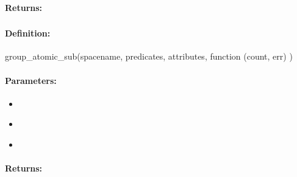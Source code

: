 \paragraph{Returns:}


\pagebreak
\subsubsection{}
\label{api:nodejs:group_atomic_sub}


\paragraph{Definition:}
\begin{javascriptcode}
group_atomic_sub(spacename, predicates, attributes, function (count, err) {})
\end{javascriptcode}
\paragraph{Parameters:}
\begin{itemize}[noitemsep]
\item {}\\

\item {}\\

\item {}\\

\end{itemize}

\paragraph{Returns:}


\pagebreak
\subsubsection{}
\label{api:nodejs:atomic_sub}


